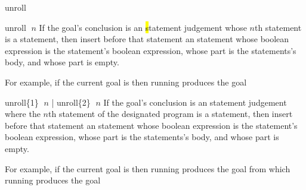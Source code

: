 \begin{tactic}{unroll}
  \begin{tsyntax}{unroll $\;n$}
    If the goal's conclusion is an \hl statement judgement whose $n$th
    statement is a  statement, then insert before that
    statement an  statement whose boolean expression is the
     statement's boolean expression, whose  part is
    the  statements's body, and whose  part is
    empty.

    \medskip For example, if the current goal is
     then
    running 
    produces the goal
  \end{tsyntax}

  \begin{tsyntax}{unroll\{1\} $\;n$ | unroll\{2\} $\;n$}
    If the goal's conclusion is an \prhl statement judgement where the
    $n$th statement of the designated program is a 
    statement, then insert before that statement an  statement
    whose boolean expression is the  statement's boolean
    expression, whose  part is the  statements's
    body, and whose  part is empty.

    \medskip For example, if the current goal is
     then
    running 
    produces the goal
    from which
    running 
    produces the goal
  \end{tsyntax}
\end{tactic}
